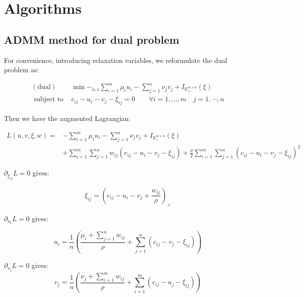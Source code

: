 \section{Algorithms}




\subsection{ADMM method for dual problem}
For convenience, introducing relaxation variables, we reformulate the dual problem as:

\begin{equation}
  \begin{array}{rl}
    {\mathrm{(dual)}} & {\min -_{u,v} \sum_{i=1}^{m} \mu_{i} u_{i}-\sum_{j=1}^{n} \nu_{j} v_{j}} + I_{\mathbb{R}_+^{m\times n}}(\xi)\\
    {\text { subject to }} & {c_{ij} - u_i - v_j -\xi_{ij}= 0\qquad\forall i=1, \ldots, m \quad j = 1,\cdots,n}
    \end{array}
\end{equation}

Then we have the augmented Lagrangian:

\begin{equation}
  \begin{aligned}L(u, v, \xi, w)=&-\sum_{i=1}^{m} \mu_{i} u_{i}-\sum_{j=1}^{n} \nu_{j} v_{j} + I_{\mathbb{R}_+^{m\times n}}(\xi)\\&+\sum_{i=1}^{m} \sum_{j=1}^{n} w_{i j}\left(c_{i j}-u_{i}-v_{j}-\xi_{i j}\right)+\frac{\rho}{2} \sum_{i=1}^{m} \sum_{j=1}^{n}\left(c_{i j}-u_{i}-v_{j}-\xi_{i j}\right)^{2}\end{aligned}
\end{equation}

$\partial_{\xi_{ij}} L = 0$ gives:

\begin{equation}
  \xi_{ij} = (c_{ij} - u_i - v_j + \frac{w_{ij}}{\rho})_+
\end{equation}

$\partial_{u_i}L = 0$ gives:

\begin{equation}
  u_i = \frac{1}{n}\left(\frac{\mu_{i}+\sum_{j=1}^{n} w_{i j}}{\rho}+\sum_{j=1}^{n}\left(c_{i j}-v_{j}-\xi_{i j}\right)\right)
\end{equation}

$\partial_{v_j} L = 0$ gives:
\begin{equation}
  v_j = \frac{1}{n}\left(\frac{\nu_{j}+\sum_{i=1}^{m} w_{i j}}{\rho}+\sum_{i=1}^{m}\left(c_{i j}-u_{j}-\xi_{i j}\right)\right)
\end{equation}

